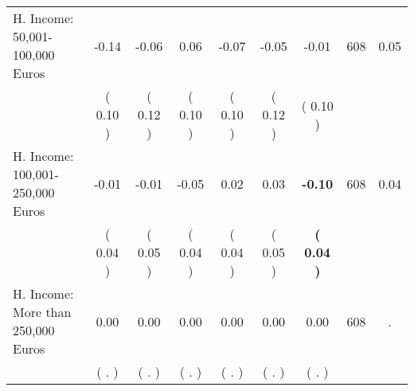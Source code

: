 \begin{tabular}{lcccccccc}
H. Income: 50,001-100,000 Euros &     -0.14 &     -0.06 &      0.06 &     -0.07 &     -0.05 &     -0.01 & 608 &       0.05 \\ 
 & (     0.10 ) & (     0.12 ) & (     0.10 ) & (     0.10 ) & (     0.12 ) & (     0.10 ) & \\
H. Income: 100,001-250,000 Euros &     -0.01 &     -0.01 &     -0.05 &      0.02 &      0.03 & \textbf{    -0.10} & 608 &       0.04 \\ 
 & (     0.04 ) & (     0.05 ) & (     0.04 ) & (     0.04 ) & (     0.05 ) & \textbf{(     0.04 )} & \\
H. Income: More than 250,000 Euros &      0.00 &      0.00 &      0.00 &      0.00 &      0.00 &      0.00 & 608 &          . \\ 
 & (        . ) & (        . ) & (        . ) & (        . ) & (        . ) & (        . ) & \\
\bottomrule
\end{tabular}
